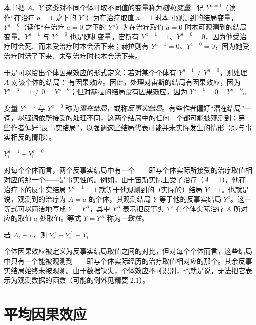 本书把 $A$、$Y$ 这类对不同个体可取不同值的变量称为\emph{随机变量}。记 $Y^{a=1}$（读作“在治疗 $a=1$ 之下的 $Y$”）为在治疗取值 $a=1$ 时本可观测到的结局变量，$Y^{a=0}$（读作“在治疗 $a=0$ 之下的 $Y$”）为在治疗取值 $a=0$ 时本可观测到的结局变量。$Y^{a=1}$ 与 $Y^{a=0}$ 也是随机变量。宙斯有 $Y^{a=1}=1$、$Y^{a=0}=0$，因为他受治疗时会死、而未受治疗时本会活下来；赫拉则有 $Y^{a=1}=0$、$Y^{a=0}=0$，因为她受治疗时活了下来、未受治疗时也本会活下来。


于是可以给出个体因果效应的形式定义：若对某个个体有 $Y^{a=1}\neq Y^{a=0}$，则处理 $A$ 对该个体的结局 $Y$ 有因果效应。因此，处理对宙斯的结局有因果效应，因为 $Y^{a=1}=1\neq 0=Y^{a=0}$；但对赫拉的结局没有因果效应，因为 $Y^{a=1}=0=Y^{a=0}$。

变量 $Y^{a=1}$ 与 $Y^{a=0}$ 称为\emph{潜在结局}，或称\emph{反事实结局}。有些作者偏好“潜在结局”一词，以强调依所接受的处理不同，这两个结局中的任何一个都可能被观测到；另一些作者偏好“反事实结局”，以强调这些结局代表可能并未实际发生的情形（即与事实相反的情形）。

\begin{defbox}[个体 $i$ 的因果效应]
$Y_i^{a=1}-Y_i^{a=0}$
\end{defbox}

对每个个体而言，两个反事实结局中有一个——即与个体实际所接受的治疗取值相对应的那一个——是事实性的。例如，由于宙斯实际上受了治疗（$A=1$），他在治疗下的反事实结局 $Y^{a=1}=1$ 就等于他观测到的（实际的）结局 $Y=1$。也就是说，观测到的治疗为 $A=a$ 的个体，其观测结局 $Y$ 等于他的反事实结局 $Y^{a}$。这一等式可以简洁地写成 $Y=Y^{A}$，其中 $Y^{A}$ 表示把反事实 $Y^{a}$ 在个体实际治疗 $A$ 所对应的取值 $a$ 处取值。等式 $Y=Y^{A}$ 称为\emph{一致性}。

\begin{defbox}[一致性]
若 $A_i=a$，则 $Y_i^{a}=Y_i^{A}=Y_i$
\end{defbox}

个体因果效应被定义为反事实结局取值之间的对比，但对每个个体而言，这些结局中只有一个能被观测到——即与个体实际经历的治疗取值相对应的那个。其余反事实结局始终未被观测。由于数据缺失，个体效应不可识别，也就是说，无法把它表示为观测数据的函数（可能的例外见精要 2.1）。

\section{平均因果效应}

